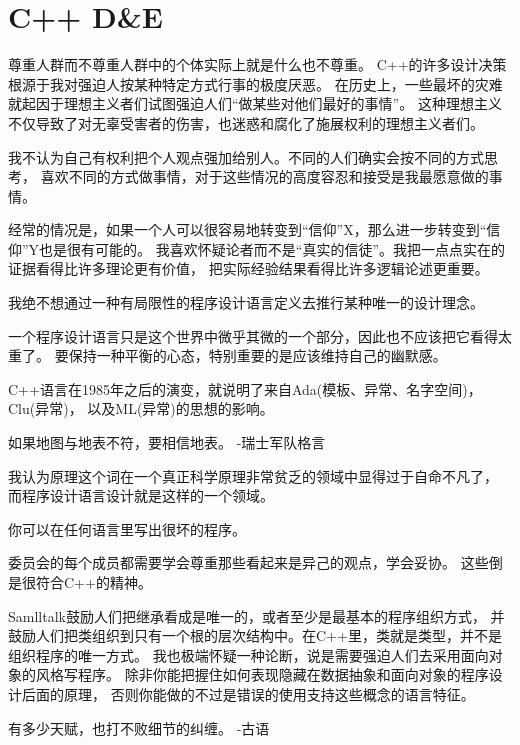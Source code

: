 \section{C++ D\&E}

尊重人群而不尊重人群中的个体实际上就是什么也不尊重。
C++的许多设计决策根源于我对强迫人按某种特定方式行事的极度厌恶。
在历史上，一些最坏的灾难就起因于理想主义者们试图强迫人们``做某些对他们最好的事情”。
这种理想主义不仅导致了对无辜受害者的伤害，也迷惑和腐化了施展权利的理想主义者们。

我不认为自己有权利把个人观点强加给别人。不同的人们确实会按不同的方式思考，
喜欢不同的方式做事情，对于这些情况的高度容忍和接受是我最愿意做的事情。

经常的情况是，如果一个人可以很容易地转变到``信仰”X，那么进一步转变到``信仰”Y也是很有可能的。
我喜欢怀疑论者而不是``真实的信徒”。我把一点点实在的证据看得比许多理论更有价值，
把实际经验结果看得比许多逻辑论述更重要。

我绝不想通过一种有局限性的程序设计语言定义去推行某种唯一的设计理念。

一个程序设计语言只是这个世界中微乎其微的一个部分，因此也不应该把它看得太重了。
要保持一种平衡的心态，特别重要的是应该维持自己的幽默感。

C++语言在1985年之后的演变，就说明了来自Ada(模板、异常、名字空间)，Clu(异常)，
以及ML(异常)的思想的影响。

如果地图与地表不符，要相信地表。 -瑞士军队格言

我认为原理这个词在一个真正科学原理非常贫乏的领域中显得过于自命不凡了，
而程序设计语言设计就是这样的一个领域。

你可以在任何语言里写出很坏的程序。

委员会的每个成员都需要学会尊重那些看起来是异己的观点，学会妥协。
这些倒是很符合C++的精神。

Samlltalk鼓励人们把继承看成是唯一的，或者至少是最基本的程序组织方式，
并鼓励人们把类组织到只有一个根的层次结构中。在C++里，类就是类型，并不是组织程序的唯一方式。
我也极端怀疑一种论断，说是需要强迫人们去采用面向对象的风格写程序。
除非你能把握住如何表现隐藏在数据抽象和面向对象的程序设计后面的原理，
否则你能做的不过是错误的使用支持这些概念的语言特征。

有多少天赋，也打不败细节的纠缠。 -古语

